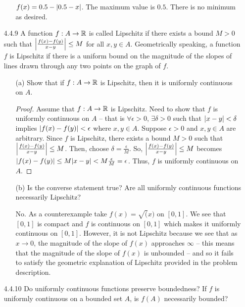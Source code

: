 \documentclass[12pt,letterpaper]{article}
\begin{document}
\begin{itemize}[leftmargin=!,labelindent=5pt]
\begin{itemize}
                    $f(x) = 0.5 - \abs{0.5-x}$. The maximum value is $0.5$. There is no minimum as desired.
            \end{itemize}
        \item [4.4.9] A function $f : A \to \mathbb{R}$ is called Lipschitz if there exists a bound $M > 0$ such that $\abs{\frac{f(x) - f(y)}{x-y}} \leq M$ for all $x,y \in A$. Geometrically speaking, a function $f$ is Lipschitz if there is a uniform bound on the magnitude of the slopes of lines drawn through any two points on the graph of $f$.
            \begin{itemize}
                \item [(a)] Show that if $f : A \to \mathbb{R}$ is Lipschitz, then it is uniformly continuous on $A$.
                    \begin{proof}
                        Assume that $f : A \to \mathbb{R}$ is Lipschitz.
                        Need to show that $f$ is uniformly continuous on $A$ -- that is $\forall \epsilon > 0$, $\exists \delta > 0$ such that $\abs{x-y} < \delta$ implies $\abs{f(x) - f(y)} < \epsilon$ where $x, y \in A$.
                        Suppose $\epsilon > 0$ and $x,y \in A$ are arbitrary.
                        Since $f$ is Lipschitz, there exists a bound $M > 0$ such that $\abs{\frac{f(x) - f(y)}{x-y}} \leq M$.
                        Then, choose $\delta = \frac{\epsilon}{M}$.
                        So, $\abs{\frac{f(x) - f(y)}{x-y}} \leq M$ becomes $\abs{f(x) - f(y)} \leq M \abs{x - y} < M \frac{\epsilon}{M} = \epsilon$.
                        Thus, $f$ is uniformly continuous on $A$.
                    \end{proof}
                \item [(b)] Is the converse statement true? Are all uniformly continuous functions necessarily Lipschitz?
                    
                    No. 
                    As a counterexample take $f(x) = \sqrt(x)$ on $[0, 1]$.
                    We see that $[0,1]$ is compact and $f$ is continuous on $[0,1]$ which makes it uniformly continuous on $[0,1]$.
                    However, it is not Lipschitz because we see that as $x \to 0$, the magnitude of the slope of $f(x)$ approaches $\infty$ -- this means that the magnitude of the slope of $f(x)$ is unbounded -- and so it fails to satisfy the geometric explanation of Lipschitz provided in the problem description.
            \end{itemize}
        \item [4.4.10] Do uniformly continuous functions preserve boundedness? If $f$ is uniformly continuous on a bounded set $A$, is $f(A)$ necessarily bounded?
        

\end{itemize}
\end{document}

